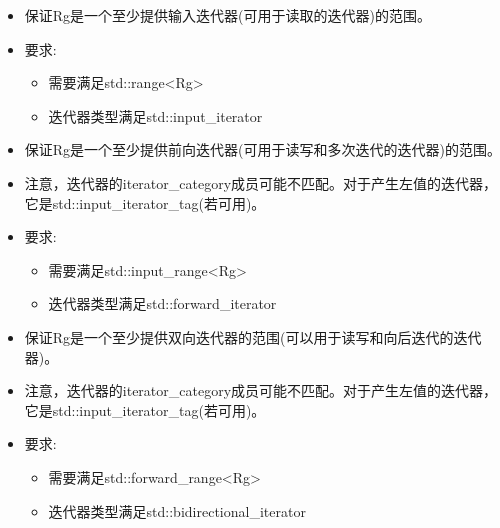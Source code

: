 
\begin{itemize}
\item
保证Rg是一个至少提供输入迭代器(可用于读取的迭代器)的范围。

\item
要求:

\begin{itemize}
\item
需要满足std::range<Rg>

\item
迭代器类型满足std::input\_iterator
\end{itemize}
\end{itemize}


\begin{itemize}
\item
保证Rg是一个至少提供前向迭代器(可用于读写和多次迭代的迭代器)的范围。

\item
注意，迭代器的iterator\_category成员可能不匹配。对于产生左值的迭代器，它是std::input\_iterator\_tag(若可用)。

\item
要求:

\begin{itemize}
\item
需要满足std::input\_range<Rg>

\item
迭代器类型满足std::forward\_iterator
\end{itemize}
\end{itemize}


\begin{itemize}
\item
保证Rg是一个至少提供双向迭代器的范围(可以用于读写和向后迭代的迭代器)。

\item
注意，迭代器的iterator\_category成员可能不匹配。对于产生左值的迭代器，它是std::input\_iterator\_tag(若可用)。

\item
要求:

\begin{itemize}
\item
需要满足std::forward\_range<Rg>

\item
迭代器类型满足std::bidirectional\_iterator
\end{itemize}
\end{itemize}

